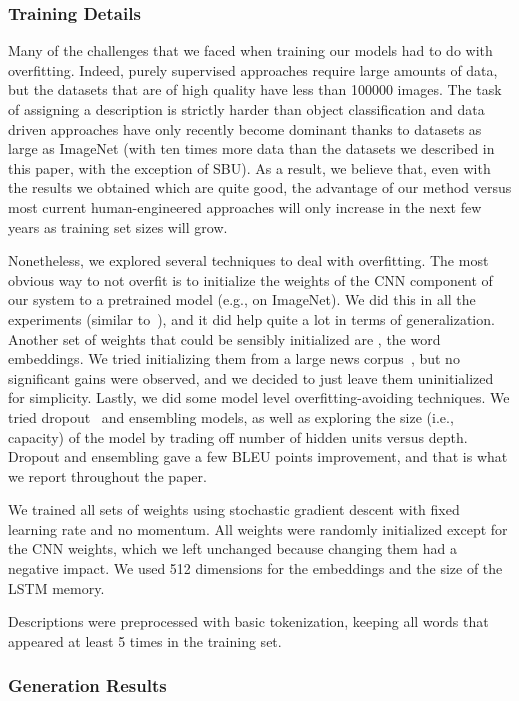 \subsubsection{Training Details}

Many of the challenges that we faced when training our models had to do with overfitting.
Indeed, purely supervised approaches require large amounts of data, but the datasets
that are of high quality have less than 100000 images. The task
of assigning a description is strictly harder than object classification and
data driven approaches have only recently become dominant thanks to datasets as large as ImageNet
(with ten times more data than the datasets we described in this paper, with the exception of SBU).
As a result, we believe that, even with the results we obtained which are quite good, the advantage
of our method versus most current human-engineered approaches will only increase in the next few years as training set sizes will grow.

Nonetheless, we explored several techniques to deal with overfitting. The most obvious
way to not overfit is to initialize the weights of the CNN component of our system to
a pretrained model (e.g., on ImageNet). We did this in all the experiments (similar to~\cite{gong2014improving}),
and it did help quite a lot in terms of generalization. Another set of weights that could
be sensibly initialized are , the word embeddings. We tried initializing them
from a large news corpus~\cite{mikolov2013}, but no significant gains were observed, and we decided
to just leave them uninitialized for simplicity. Lastly, we did some model level overfitting-avoiding
techniques. We tried dropout~\cite{zaremba2014} and ensembling models, as well as exploring the size
(i.e., capacity) of the model by trading off number of hidden units versus depth. Dropout and ensembling
gave a few BLEU points improvement, and that is what we report throughout the paper.

We trained all sets of weights using stochastic gradient descent
with fixed learning rate and no momentum.
All weights were randomly initialized except for the CNN weights,
which we left unchanged because changing them had a negative impact.
We used 512 dimensions for the embeddings and the size of the LSTM memory.

Descriptions were preprocessed with basic tokenization, keeping all words
that appeared at least 5 times in the training set.

\subsubsection{Generation Results}

